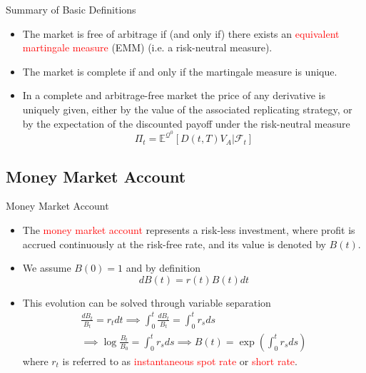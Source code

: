 \documentclass{beamer}
\begin{document}
\begin{frame}{Summary of Basic Definitions}
	\begin{itemize}
		\item The market is free of arbitrage if (and only if) there exists an \textcolor{red}{equivalent martingale measure} (EMM) (i.e. a risk-neutral measure).
		\item The market is complete if and only if the martingale measure is unique.
		\item In a complete and arbitrage-free market the price of any derivative is uniquely given, either by the value of the associated replicating strategy, or by the expectation of the discounted payoff under the risk-neutral measure
		\begin{equation}
			\Pi_t = \mathbb{E}^{\mathcal{Q}^0}[D(t,T)V_A|\mathcal{F}_t]
			\label{eq:risk_neutral_pricing}
		\end{equation}
	\end{itemize}
\end{frame}

\subsection{Money Market Account}
\begin{frame}{Money Market Account}
	\begin{itemize}
		\item<0-> The \textcolor{red}{money market account} represents a risk-less investment, where profit is accrued continuously at the risk-free rate, and its value is denoted by $B(t)$.
		\item<1-> We assume $B(0)=1$ and by definition
		\begin{equation}
			dB(t) = r(t)B(t)dt
		\end{equation}
		\item<2-> This evolution can be solved through variable separation
        \begin{equation}
            \begin{gathered}
            \frac{dB_t}{B_t} = r_t dt \implies \int_0^t \frac{dB_t}{B_t} = \int_0^t r_s ds \\
			\implies \log\frac{B_t}{B_0} = \int_0^t r_s ds \implies \boxed{B(t) = \exp\left(\int_0^t r_s ds\right)}
            \end{gathered}
		\end{equation}
		where $r_t$ is referred to as \textcolor{red}{instantaneous spot rate} or \textcolor{red}{short rate}.
	\end{itemize}
\end{frame}
\end{document}
